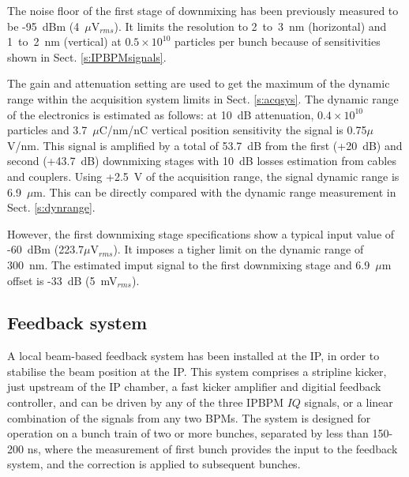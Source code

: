 The noise floor of the first stage of downmixing has been previously measured to be -95~dBm (4~$\mu$V$_{rms}$). It limits the resolution to 2~to~3~nm (horizontal) and 1~to~2~nm (vertical) at $0.5\times10^{10}$ particles per bunch because of sensitivities shown in Sect. \ref{s:IPBPMsignals}.\par
The gain and attenuation setting are used to get the maximum of the dynamic range within the acquisition system limits in Sect. \ref{s:acqsys}.
The dynamic range of the electronics is estimated as follows: at 10~dB attenuation, $0.4\times10^{10}$ particles and 3.7~$\mu$C/nm/nC vertical position sensitivity the signal is 0.75$\mu$V/nm. This signal is amplified by a total of 53.7~dB from the first (+20~dB) and second (+43.7~dB) downmixing stages with 10~dB losses estimation from cables and couplers. Using +2.5~V of the acquisition range, the signal dynamic range is 6.9~$\mu$m. This can be directly compared with the dynamic range measurement in Sect. \ref{s:dynrange}.\par
However, the first downmixing stage specifications show a typical input value of -60~dBm (223.7$\mu$V$_{rms}$). It imposes a tigher limit on the dynamic range of 300~nm. The estimated imput signal to the first downmixing stage and 6.9~$\mu$m offset is -33~dB (5~mV$_{rms}$).\par
\subsection{Feedback system}
A local beam-based feedback system has been installed at the IP, in order to stabilise the beam position at the IP. This system comprises a stripline kicker, just upstream of the IP chamber, a fast kicker amplifier and digitial feedback controller, and can be driven by any of the three IPBPM $IQ$ signals, or a linear combination of the signals from any two BPMs. The system is designed for operation on a bunch train of two or more bunches, separated by less than 150-200 ns, where the measurement of first bunch provides the input to the feedback system, and the correction is applied to subsequent bunches.\par
